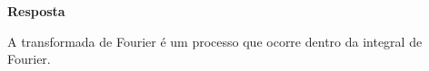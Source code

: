 \linespread{1.5}

\textbf{Resposta}

A transformada de Fourier é um processo que ocorre dentro da integral de Fourier.